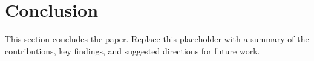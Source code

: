 
\section{Conclusion}


This section concludes the paper. Replace this placeholder with a
summary of the contributions, key findings, and suggested directions
for future work.

